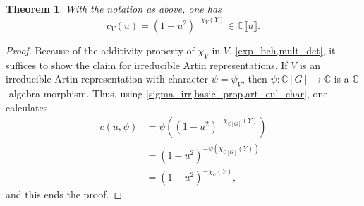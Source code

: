 \documentclass[11pt]{amsart}
\newtheorem{theorem}{Theorem}[section]
\numberwithin{equation}{section}
\theoremstyle{remark}
\theoremstyle{definition}
\begin{document}
\begin{theorem} \label{art_c}
With the notation as above, one has
$$c_{V}(u) = (1-u^{2})^{-\chi_{V}(Y)} \in \mathbb{C}\llbracket u \rrbracket. $$
\end{theorem}
\begin{proof}
Because of the additivity property of $\chi_{V}$ in $V$, \cref{exp_beh,mult_det}, it suffices to show the claim for irreducible Artin representations.  If $V$ is an irreducible Artin representation with character $\psi = \psi_{V}$, then $\psi:\mathbb{C}[G] \rightarrow \mathbb{C}$ is a $\mathbb{C}$-algebra morphism.  Thus, using \cref{sigma_irr,basic_prop,art_eul_char}, one calculates
\begin{equation*}
\begin{aligned}
c(u,\psi) &= \psi\left((1-u^{2})^{-\chi_{\mathbb{C}[G]}(Y)} \right) \\
&= (1-u^{2})^{-\psi(\chi_{\mathbb{C}[G]}(Y))} \\
&= (1-u^{2})^{-\chi_{\psi}(Y)},
\end{aligned}
\end{equation*}
and this ends the proof.
\end{proof}
\end{document}
